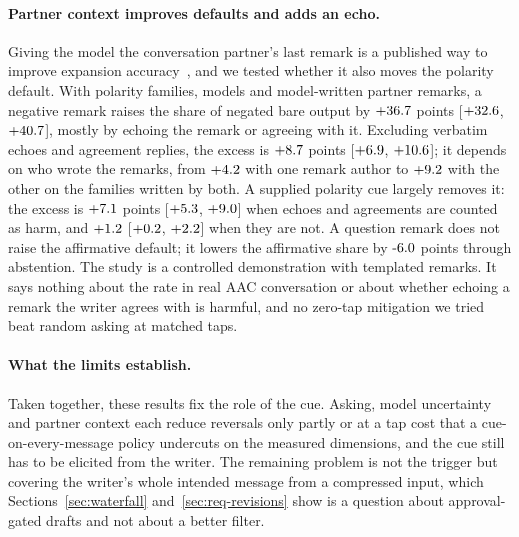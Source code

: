 \paragraph{Partner context improves defaults and adds an echo.}
Giving the model the conversation partner's last remark is a published way to improve expansion accuracy~\cite{cai2022abbrev}, and we tested whether it also moves the polarity default.
With \jmpcFamilies{} polarity families, \jmpcModels{} models and model-written partner remarks, a negative remark raises the share of negated bare output by $+36.7$ points [$+32.6$, $+40.7$], mostly by echoing the remark or agreeing with it.
Excluding verbatim echoes and agreement replies, the excess is $+8.7$ points [$+6.9$, $+10.6$]; it depends on who wrote the remarks, from $+4.2$ with one remark author to $+9.2$ with the other on the \jmpcAuthFamilies{} families written by both.
A supplied polarity cue largely removes it: the excess is $+7.1$ points [$+5.3$, $+9.0$] when echoes and agreements are counted as harm, and $+1.2$ [$+0.2$, $+2.2$] when they are not.
A question remark does not raise the affirmative default; it lowers the affirmative share by $\jmpcQAff$ points through abstention.
The study is a controlled demonstration with templated remarks.
It says nothing about the rate in real AAC conversation or about whether echoing a remark the writer agrees with is harmful, and no zero-tap mitigation we tried beat random asking at matched taps.

\paragraph{What the limits establish.}
Taken together, these results fix the role of the cue.
Asking, model uncertainty and partner context each reduce reversals only partly or at a tap cost that a cue-on-every-message policy undercuts on the measured dimensions, and the cue still has to be elicited from the writer.
The remaining problem is not the trigger but covering the writer's whole intended message from a compressed input, which Sections~\ref{sec:waterfall} and~\ref{sec:req-revisions} show is a question about approval-gated drafts and not about a better filter.
